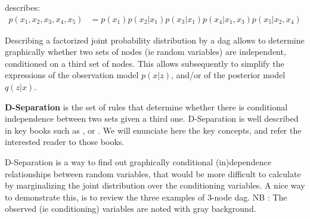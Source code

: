 \begin{center}
\end{center}
describes:
\begin{align}
    p(x_1,x_2,x_3,x_4,x_5) &= p(x_1)p(x_2\vert x_1)p(x_3\vert x_1)p(x_4 \vert x_1, x_3)p(x_5 \vert x_2, x_4)
\end{align}


Describing a factorized joint probability distribution by a \gls{dag} allows to determine graphically whether 
two sets of nodes (ie random variables) are independent, conditioned on a third set of nodes. 
This allows subsequently to simplify the expressions of the observation model $p(x \vert z)$, and/or of 
the posterior model $q(z \vert x)$.

\textbf{D-Separation} is the set of rules that determine whether there is conditional independence between two sets given a third one. D-Separation is well described in key books such as \cite{PRML}, \cite{ProbabilisticGraphicalModels} or \cite{ProbabilisticMachineLearning}. We will enunciate here the key concepts, and refer the interested reader to those books.


D-Separation is a way to find out graphically conditional (in)dependence relationships between random variables, that would be more difficult to calculate by marginalizing the joint distribution over the conditioning variables. A nice way to demonstrate this, is to review the three examples of 3-node \gls{dag}. 
NB : The observed (ie conditioning) variables are noted with gray background.

